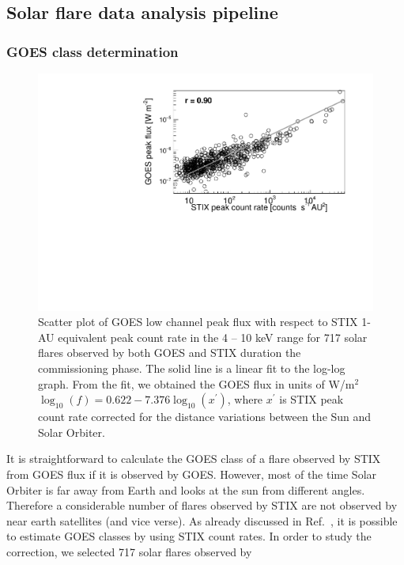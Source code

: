 \documentclass[referee]{aa} %
\begin{document}
\subsection{Solar flare data analysis pipeline}
\subsubsection{GOES class determination}
\begin{figure}
  \centering
  \includegraphics[width=0.8\linewidth]{figures/goes_stix_flux_paper.pdf}
  \caption{Scatter plot of GOES low channel peak flux with respect to STIX 1-AU equivalent  peak count rate in the 4 -- 10 keV range
  for 717 solar flares observed by both GOES and STIX duration the commissioning phase. 
  The solid line is a linear fit to the log-log graph. 
From the fit, we obtained 
the GOES flux in units of W/m$^2$ $\log_{10}(f) = 0.622 -7.376 \log_{10} (x^{'})$,
where $x^{'}$ is STIX
peak count rate corrected for the distance variations between the Sun and Solar Orbiter. 
}
\label{fig:goes-stix}
\end{figure}
It is straightforward to calculate the GOES
class of a flare observed by STIX from GOES flux if it is observed by GOES. 
However,  most of the time Solar Orbiter is far away from Earth and looks at 
the sun from different angles. Therefore a considerable number of flares observed by STIX
 are not observed by near earth satellites (and vice verse). 
As already discussed in Ref.~\cite{andrea2021}, 
it is possible to estimate GOES classes by using STIX count rates.
In order to study the correction, we selected 717 solar flares observed by 
\end{document}
